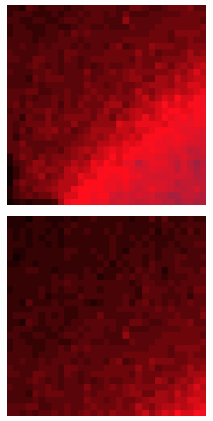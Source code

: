 \documentclass[10pt]{scrartcl}
\begin{document}
\begin{figure}[!ht]
    \begin{subfigure}[b]{.3\linewidth}
        \centering
        \includegraphics[width=1.2\linewidth]{../plots_tables_images/1d1dcrop_0_8.eps}
    \end{subfigure}
    \begin{subfigure}[b]{.3\linewidth}
        \centering
        \includegraphics[width=1.2\linewidth]{../plots_tables_images/1d1dcrop_0_9.eps}

\end{subfigure}
\end{figure}
\end{document}
